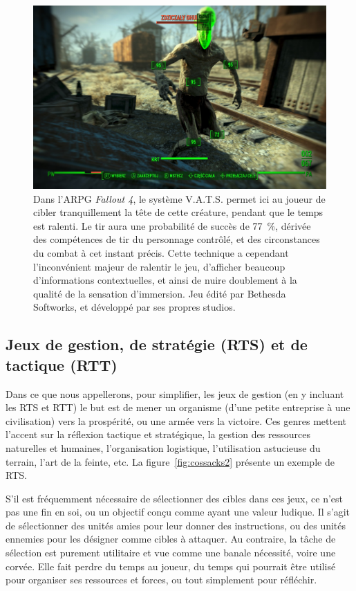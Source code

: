 	\begin{figure}[H]
		\centering
		\includegraphics[width=\textwidth]{figures/ch1/f4vats}
		\caption[Système V.A.T.S permettant de faciliter les tirs dans \emph{Fallout 4}.]{Dans l'ARPG \emph{Fallout 4}, le système V.A.T.S. permet ici au joueur de cibler tranquillement la tête de cette créature, pendant que le temps est ralenti. Le tir aura une probabilité de succès de 77~\%{}, dérivée des compétences de tir du personnage contrôlé, et des circonstances du combat à cet instant précis. Cette technique a cependant l'inconvénient majeur de ralentir le jeu, d'afficher beaucoup d'informations contextuelles, et ainsi de nuire doublement à la qualité de la sensation d'immersion. Jeu édité par Bethesda Softworks, et développé par ses propres studios.}
		\label{fig:f4vats}
	\end{figure}
	
	
	\subsection{Jeux de gestion, de stratégie (RTS) et de tactique (RTT)}
	Dans ce que nous appellerons, pour simplifier, les jeux de gestion (en y incluant les RTS et RTT) le but est de mener un organisme (d'une petite entreprise à une civilisation) vers la prospérité, ou une armée vers la victoire. Ces genres mettent l'accent sur la réflexion tactique et stratégique, la gestion des ressources naturelles et humaines, l'organisation logistique, l'utilisation astucieuse du terrain, l'art de la feinte, etc. La figure~\ref{fig:cossacks2} présente un exemple de RTS.
	
	S'il est fréquemment nécessaire de sélectionner des cibles dans ces jeux, ce n'est pas une fin en soi, ou un objectif conçu comme ayant une valeur ludique. Il s'agit de sélectionner des unités amies pour leur donner des instructions, ou des unités ennemies pour les désigner comme cibles à attaquer. Au contraire, la tâche de sélection est purement utilitaire et vue comme une banale nécessité, voire une corvée. Elle fait perdre du temps au joueur, du temps qui pourrait être utilisé pour organiser ses ressources et forces, ou tout simplement pour réfléchir.
	
